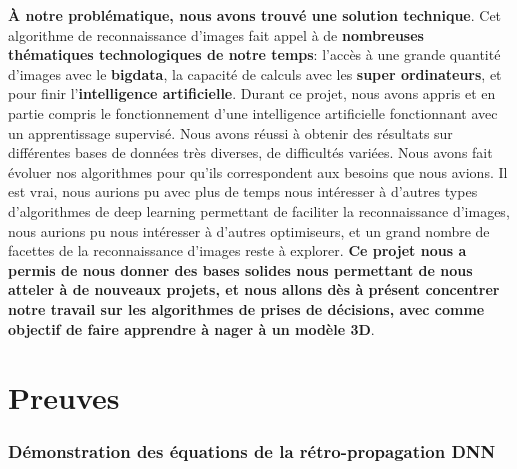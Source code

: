 \documentclass[12pt,a4paper]{extarticle}
\begin{document}
\textbf{À notre problématique, nous avons trouvé une solution technique}. Cet algorithme de reconnaissance d'images fait appel à de \textbf{nombreuses thématiques technologiques de notre temps}: l'accès à une grande quantité d'images avec le \textbf{bigdata}, la capacité de calculs avec les \textbf{super ordinateurs}, et pour finir l'\textbf{intelligence artificielle}. Durant ce projet, nous avons appris et en partie compris le fonctionnement d'une intelligence artificielle fonctionnant avec un apprentissage supervisé. Nous avons réussi à obtenir des résultats sur différentes bases de données très diverses, de difficultés variées. Nous avons fait évoluer nos algorithmes pour qu'ils correspondent aux besoins que nous avions. Il est vrai, nous aurions pu avec plus de temps nous intéresser à d'autres types d'algorithmes de deep learning permettant de faciliter la reconnaissance d'images, nous aurions pu nous intéresser à d'autres optimiseurs, et un grand nombre de facettes de la reconnaissance d'images reste à explorer. \textbf{Ce projet nous a permis de nous donner des bases solides nous permettant de nous atteler à de nouveaux projets, et nous allons dès à présent concentrer notre travail sur les algorithmes de prises de décisions, avec comme objectif de faire apprendre à nager à un modèle 3D}. 

\newpage 




\newpage
\part{Preuves}
\section{Démonstration des équations de la rétro-propagation DNN}
\end{document}
